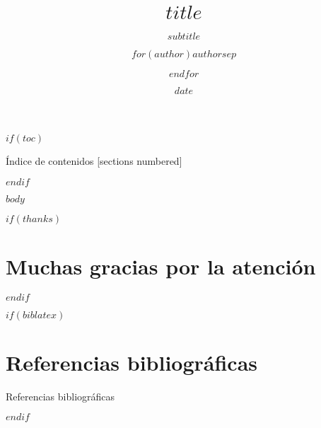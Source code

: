 \documentclass[$if(fontsize)$$fontsize$,$endif$$if(handout)$handout,$endif$$for(classoption)$$classoption$$sep$,$endfor$]{beamer}
\title{$title$}
\subtitle{$subtitle$}
\author{$for(author)$$author$$sep$ \and $endfor$}
\institute{$for(institute)$$institute$$sep$ \and $endfor$}
\date{$date$}
\newcounter{cont}
\begin{document}
\maketitle


$if(toc)$
\begin{frame}{Índice de contenidos}
  [sections numbered]
  \tableofcontents[hideallsubsections]
\end{frame}
$endif$


$body$

$if(thanks)$
\section{Muchas gracias por la atención}\label{atencion}
$endif$

$if(biblatex)$
\section{Referencias bibliográficas}\label{refs-bib}
\begin{frame}[allowframebreaks]{Referencias bibliográficas}
\printbibliography[heading=none]
\end{frame}
$endif$
\end{document}
